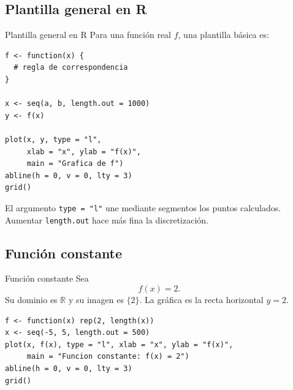 \documentclass[aspectratio=169,10pt]{beamer}
\newcommand{\R}{\mathbb{R}}
\begin{document}
\subsection{Plantilla general en R}
\begin{frame}{Plantilla general en R}
Para una función real $f$, una plantilla básica es:

\begin{verbatim}
f <- function(x) {
  # regla de correspondencia
}

x <- seq(a, b, length.out = 1000)
y <- f(x)

plot(x, y, type = "l",
     xlab = "x", ylab = "f(x)",
     main = "Grafica de f")
abline(h = 0, v = 0, lty = 3)
grid()
\end{verbatim}

El argumento \texttt{type = "l"} une mediante segmentos los puntos calculados.
Aumentar \texttt{length.out} hace más fina la discretización.

\end{frame}
\subsection{Función constante}
\begin{frame}{Función constante}
Sea
\[
f(x)=2.
\]
Su dominio es $\R$ y su imagen es $\{2\}$. La gráfica es la recta horizontal
$y=2$.

\begin{center}
\end{center}

\begin{verbatim}
f <- function(x) rep(2, length(x))
x <- seq(-5, 5, length.out = 500)
plot(x, f(x), type = "l", xlab = "x", ylab = "f(x)",
     main = "Funcion constante: f(x) = 2")
abline(h = 0, v = 0, lty = 3)
grid()
\end{verbatim}

\end{frame}
\end{document}
